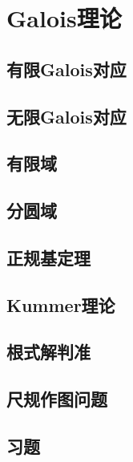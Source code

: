 \chapter{Galois理论}

\section{有限Galois对应}
\section{无限Galois对应}
\section{有限域}
\section{分圆域}
\section{正规基定理}
\section{Kummer理论}
\section{根式解判准}
\section{尺规作图问题}
\section{习题}